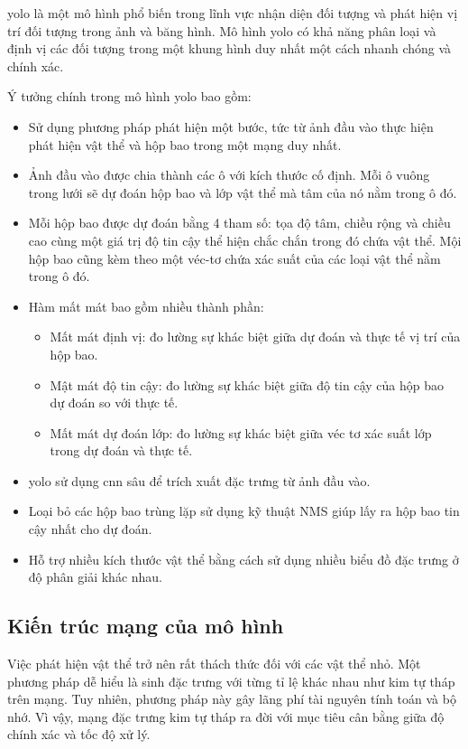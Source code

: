 \acrshort{yolo} là một mô hình phổ biến trong lĩnh vực nhận diện đối tượng và phát hiện vị trí đối tượng trong ảnh và băng hình. Mô hình \acrshort{yolo} có khả năng phân loại và định vị các đối tượng trong một khung hình duy nhất một cách nhanh chóng và chính xác.

Ý tưởng chính trong mô hình \acrshort{yolo} bao gồm:
\begin{itemize}
	\item Sử dụng phương pháp phát hiện một bước, tức từ ảnh đầu vào thực hiện phát hiện vật thể và hộp bao trong một mạng duy nhất.
	\item Ảnh đầu vào được chia thành các ô với kích thước cố định. Mỗi ô vuông trong lưới sẽ dự đoán hộp bao và lớp vật thể mà tâm của nó nằm trong ô đó.
	\item Mỗi hộp bao được dự đoán bằng 4 tham số: tọa độ tâm, chiều rộng và chiều cao cùng một giá trị độ tin cậy thể hiện chắc chắn trong đó chứa vật thể.
	Mội hộp bao cũng kèm theo một véc-tơ chứa xác suất của các loại vật thể nằm trong ô đó.
	
	\item Hàm mất mát bao gồm nhiều thành phần:
	\begin{itemize}
		\item Mất mát định vị: đo lường sự khác biệt giữa dự đoán và thực tế vị trí của hộp bao.
		\item Mật mát độ tin cậy: đo lường sự khác biệt giữa độ tin cậy của hộp bao dự đoán so với thực tế.
		\item Mất mát dự đoán lớp: đo lường sự khác biệt giữa véc tơ xác suất lớp trong dự đoán và thực tế.
	\end{itemize}
	\item \acrshort{yolo} sử dụng \acrshort{cnn} sâu để trích xuất đặc trưng từ ảnh đầu vào.
	\item Loại bỏ các hộp bao trùng lặp sử dụng kỹ thuật NMS giúp lấy ra hộp bao tin cậy nhất cho dự đoán.
	\item Hỗ trợ nhiều kích thước vật thể bằng cách sử dụng nhiều biểu đồ đặc trưng ở độ phân giải khác nhau.
\end{itemize}

\subsection{Kiến trúc mạng của mô hình}

Việc phát hiện vật thể trở nên rất thách thức đối với các vật thể nhỏ. Một phương pháp dễ hiểu là sinh đặc trưng với từng tỉ lệ khác nhau như kim tự tháp trên mạng. Tuy nhiên, phương pháp này gây lãng phí tài nguyên tính toán và bộ nhớ. Vì vậy, mạng đặc trưng kim tự tháp ra đời với mục tiêu cân bằng giữa độ chính xác và tốc độ xử lý.

